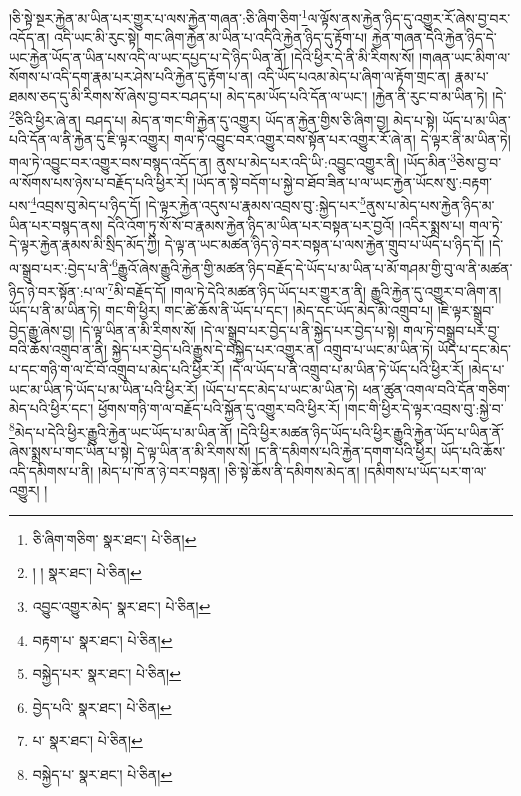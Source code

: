 །ཅི་སྟེ་སྔར་རྐྱེན་མ་ཡིན་པར་གྱུར་པ་ལས་རྐྱེན་གཞན་:ཅི་ཞིག་ཅིག་\footnote{ཅི་ཞིག་གཅིག་  སྣར་ཐང་།  པེ་ཅིན། }ལ་ལྟོས་ནས་རྐྱེན་ཉིད་དུ་འགྱུར་རོ་ཞེས་བྱ་བར་འདོད་ན། འདི་ཡང་མི་རུང་སྟེ། གང་ཞིག་རྐྱེན་མ་ཡིན་པ་འདིའི་རྐྱེན་ཉིད་དུ་རྟོག་པ། རྐྱེན་གཞན་དེའི་རྐྱེན་ཉིད་དེ་ཡང་རྐྱེན་ཡོད་ན་ཡིན་པས་འདི་ལ་ཡང་དཔྱད་པ་དེ་ཉིད་ཡིན་ནོ། །དེའི་ཕྱིར་དེ་ནི་མི་རིགས་སོ། །གཞན་ཡང་མིག་ལ་སོགས་པ་འདི་དག་རྣམ་པར་ཤེས་པའི་རྐྱེན་དུ་རྟོག་པ་ན། འདི་ཡོད་པའམ་མེད་པ་ཞིག་ལ་རྟོག་གྲང་ན། རྣམ་པ་ཐམས་ཅད་དུ་མི་རིགས་སོ་ཞེས་བྱ་བར་བཤད་པ། མེད་དམ་ཡོད་པའི་དོན་ལ་ཡང་། །རྐྱེན་ནི་རུང་བ་མ་ཡིན་ཏེ། །དེ་\footnote{། །  སྣར་ཐང་།  པེ་ཅིན། }ཅིའི་ཕྱིར་ཞེ་ན། བཤད་པ། མེད་ན་གང་གི་རྐྱེན་དུ་འགྱུར། ཡོད་ན་རྐྱེན་གྱིས་ཅི་ཞིག་བྱ། མེད་པ་སྟེ། ཡོད་པ་མ་ཡིན་པའི་དོན་ལ་ནི་རྐྱེན་དུ་ཇི་ལྟར་འགྱུར། གལ་ཏེ་འབྱུང་བར་འགྱུར་བས་སྟོན་པར་འགྱུར་རོ་ཞེ་ན། དེ་ལྟར་ནི་མ་ཡིན་ཏེ། གལ་ཏེ་འབྱུང་བར་འགྱུར་བས་བསྙད་འདོད་ན། ནུས་པ་མེད་པར་འདི་ཡི་:འབྱུང་འགྱུར་ནི། །ཡོད་མིན་\footnote{འབྱུང་འགྱུར་མེད་  སྣར་ཐང་།  པེ་ཅིན། }ཅེས་བྱ་བ་ལ་སོགས་པས་ཉེས་པ་བརྗོད་པའི་ཕྱིར་རོ། །ཡོད་ན་སྟེ་བདོག་པ་སྐྱེ་བ་ཐོབ་ཟིན་པ་ལ་ཡང་རྐྱེན་ཡོངས་སུ་:བརྟག་པས་\footnote{བརྟག་པ་  སྣར་ཐང་།  པེ་ཅིན། }འབྲས་བུ་མེད་པ་ཉིད་དོ། །དེ་ལྟར་རྐྱེན་འདུས་པ་རྣམས་འབྲས་བུ་:སྐྱེད་པར་\footnote{བསྐྱེད་པར་  སྣར་ཐང་།  པེ་ཅིན། }ནུས་པ་མེད་པས་རྐྱེན་ཉིད་མ་ཡིན་པར་བསྙད་ནས། དེའི་འོག་ཏུ་སོ་སོ་བ་རྣམས་རྐྱེན་ཉིད་མ་ཡིན་པར་བསྟན་པར་བྱའོ། །འདིར་སྨྲས་པ། གལ་ཏེ་དེ་ལྟར་རྐྱེན་རྣམས་མི་སྲིད་མོད་ཀྱི། དེ་ལྟ་ན་ཡང་མཚན་ཉིད་ཉེ་བར་བསྟན་པ་ལས་རྐྱེན་གྲུབ་པ་ཡོད་པ་ཉིད་དོ། །དེ་ལ་སྒྲུབ་པར་:བྱེད་པ་ནི་\footnote{བྱེད་པའི་  སྣར་ཐང་།  པེ་ཅིན། }རྒྱུའོ་ཞེས་རྒྱུའི་རྐྱེན་གྱི་མཚན་ཉིད་བརྗོད་དེ་ཡོད་པ་མ་ཡིན་པ་མོ་གཤམ་གྱི་བུ་ལ་ནི་མཚན་ཉིད་ཉེ་བར་སྟོན་:པ་ལ་\footnote{པ་  སྣར་ཐང་།  པེ་ཅིན། }མི་བརྗོད་དོ། །གལ་ཏེ་དེའི་མཚན་ཉིད་ཡོད་པར་གྱུར་ན་ནི། རྒྱུའི་རྐྱེན་དུ་འགྱུར་བ་ཞིག་ན། ཡོད་པ་ནི་མ་ཡིན་ཏེ། གང་གི་ཕྱིར། གང་ཚེ་ཆོས་ནི་ཡོད་པ་དང་། །མེད་དང་ཡོད་མེད་མི་འགྲུབ་པ། །ཇི་ལྟར་སྒྲུབ་བྱེད་རྒྱུ་ཞེས་བྱ། །དེ་ལྟ་ཡིན་ན་མི་རིགས་སོ། །དེ་ལ་སྒྲུབ་པར་བྱེད་པ་ནི་སྐྱེད་པར་བྱེད་པ་སྟེ། གལ་ཏེ་བསྒྲུབ་པར་བྱ་བའི་ཆོས་འགྲུབ་ན་ནི། སྐྱེད་པར་བྱེད་པའི་རྒྱུས་དེ་བསྐྱེད་པར་འགྱུར་ན། འགྲུབ་པ་ཡང་མ་ཡིན་ཏེ། ཡོད་པ་དང་མེད་པ་དང་གཉི་ག་ལ་ངོ་བོ་འགྲུབ་པ་མེད་པའི་ཕྱིར་རོ། །དེ་ལ་ཡོད་པ་ནི་འགྲུབ་པ་མ་ཡིན་ཏེ་ཡོད་པའི་ཕྱིར་རོ། །མེད་པ་ཡང་མ་ཡིན་ཏེ་ཡོད་པ་མ་ཡིན་པའི་ཕྱིར་རོ། །ཡོད་པ་དང་མེད་པ་ཡང་མ་ཡིན་ཏེ། ཕན་ཚུན་འགལ་བའི་དོན་གཅིག་མེད་པའི་ཕྱིར་དང་། ཕྱོགས་གཉི་ག་ལ་བརྗོད་པའི་སྐྱོན་དུ་འགྱུར་བའི་ཕྱིར་རོ། །གང་གི་ཕྱིར་དེ་ལྟར་འབྲས་བུ་:སྐྱེ་བ་\footnote{བསྐྱེད་པ་  སྣར་ཐང་།  པེ་ཅིན། }མེད་པ་དེའི་ཕྱིར་རྒྱུའི་རྐྱེན་ཡང་ཡོད་པ་མ་ཡིན་ནོ། །དེའི་ཕྱིར་མཚན་ཉིད་ཡོད་པའི་ཕྱིར་རྒྱུའི་རྐྱེན་ཡོད་པ་ཡིན་ནོ་ཞེས་སྨྲས་པ་གང་ཡིན་པ་སྟེ། དེ་ལྟ་ཡིན་ན་མི་རིགས་སོ། །ད་ནི་དམིགས་པའི་རྐྱེན་དགག་པའི་ཕྱིར། ཡོད་པའི་ཆོས་འདི་དམིགས་པ་ནི། །མེད་པ་ཁོ་ན་ཉེ་བར་བསྟན། །ཅི་སྟེ་ཆོས་ནི་དམིགས་མེད་ན། །དམིགས་པ་ཡོད་པར་ག་ལ་འགྱུར། །
